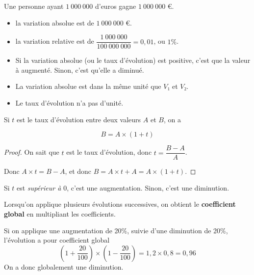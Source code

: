 \documentclass[
	classe=$2^{de}$
]{coursclass}
\begin{document}
\begin{exemple}
	Une personne ayant $1\ 000\ 000$ d'euros gagne $1\ 000\ 000$ €.

	\begin{itemize}
		\item la variation absolue est de $1\ 000\ 000$ €.
		\item la variation relative est de $\dfrac{1\ 000\ 000}{100\ 000\ 000} = 0,01$, ou $1\%$.
	\end{itemize}
\end{exemple}

\begin{remarque}
	\begin{itemize}
		\item Si la variation absolue (ou le taux d'évolution) est positive, c'est que la valeur à augmenté. Sinon, c'est qu'elle a diminué.
		\item La variation absolue est dans la même unité que $V₁$ et $V₂$.
		\item Le taux d'évolution n'a pas d'unité.
	\end{itemize}
\end{remarque}

\begin{propriete}
	Si $t$ est le taux d'évolution entre deux valeurs $A$ et $B$, on a

	$$ B = A × (1 + t) $$
\end{propriete}
\begin{proof}
	On sait que $t$ est le taux d'évolution, donc $t = \dfrac{B - A}{A}$.

	Donc $A × t = B - A$, et donc
	$B = A × t + A = A × (1 + t)$.
\end{proof}

\begin{remarque}
	Si $t$ est \textit{supérieur à $0$}, c'est une augmentation. Sinon, c'est une diminution.
\end{remarque}

\begin{propriete}
	Lorsqu'on applique plusieurs évolutions successives, on obtient le \textbf{coefficient global} en multipliant les coefficients.
\end{propriete}
\begin{exemple}
	Si on applique une augmentation de 20\%, suivie d'une diminution de 20\%, l'évolution a pour coefficient global
	$$ \left(1 + \frac{20}{100}\right) × \left(1 - \frac{20}{100}\right) = 1,2 × 0,8 = 0,96 $$
	On a donc globalement une diminution.
\end{exemple}
\end{document}
